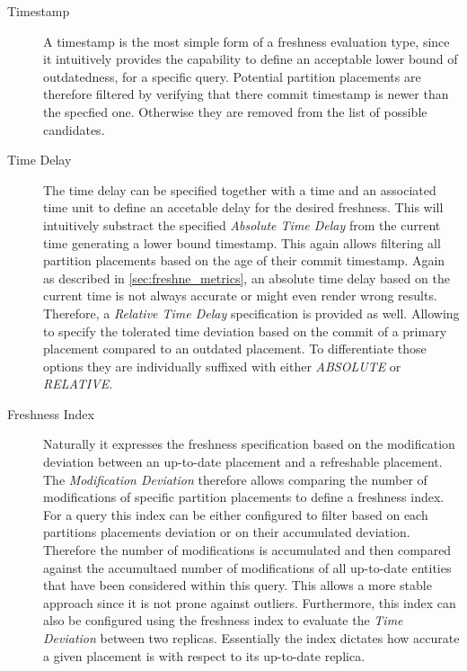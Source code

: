 \begin{description}
    \item[Timestamp] A timestamp is the most simple form of a freshness evaluation type, since it intuitively provides the capability to define 
    an acceptable lower bound of outdatedness, for a specific query. Potential partition placements are therefore filtered by verifying that there commit timestamp is newer
    than the specfied one. Otherwise they are removed from the list of possible candidates.
    
    \item[Time Delay]
    The time delay can be specified together with a time and an associated time unit to define an accetable delay for the desired freshness. 
    This will intuitively substract the specified \emph{Absolute Time Delay} from the current time generating a lower bound timestamp. 
    This again allows filtering all partition placements based on the age of their commit timestamp.
    Again as described in \ref{sec:freshne_metrics}, an absolute time delay based on the current time is not always accurate or might even render wrong results.
    Therefore, a \emph{Relative Time Delay} specification is provided as well. Allowing to specify the tolerated time deviation based on the commit of a primary placement 
    compared to an outdated placement. To differentiate those options they are individually suffixed with either \emph{ABSOLUTE} or  \emph{RELATIVE}.

    \item[Freshness Index]
    Naturally it expresses the freshness specification based on the modification deviation between an up-to-date placement
    and a refreshable placement. The \emph{Modification Deviation} therefore allows comparing the number of modifications of specific partition placements
    to define a freshness index. For a query this index can be either configured to filter based on each partitions placements deviation or on their accumulated deviation.
    Therefore the number of modifications is accumulated and then compared against the accumultaed number of modifications 
    of all up-to-date entities that have been considered within this query. This allows a more stable approach since it is not prone against outliers. 
    Furthermore, this index can also be configured using the freshness index to evaluate the \emph{Time Deviation} between two replicas. 
    Essentially the index dictates how accurate a given placement is with respect to its up-to-date replica.
    
\end{description}

